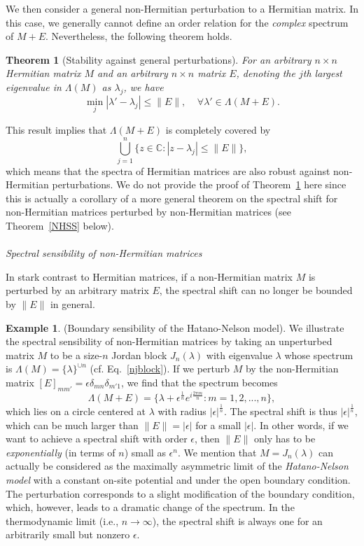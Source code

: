 \documentclass{tADP2e}
\theoremstyle{plain}
\theoremstyle{plain}
\newtheorem{theorem}{Theorem}[section]
\theoremstyle{definition}
\newtheorem{example}{Example}[section]
\newcommand{\exmp}[1]{
\begin{example}
	#1
\end{example}
}
\begin{document}
We then consider a general non-Hermitian perturbation to a Hermitian matrix. In this case, we generally cannot define an order relation for the \emph{complex} spectrum of $M+E$. Nevertheless, the following theorem holds. 
\begin{theorem}[Stability against general perturbations]
\label{HNH}
For an arbitrary $n\times n$ Hermitian matrix $M$ and an arbitrary $n\times n$ matrix $E$, denoting the $j$th largest eigenvalue in $\Lambda(M)$ as $\lambda_j$, we have
\begin{equation}
\min_j|\lambda'-\lambda_j|\le \|E\|,\;\;\;\;\forall \lambda'\in\Lambda(M+E).
\label{NHpert}
\end{equation}
\end{theorem}
\noindent This result implies that $\Lambda(M+E)$ is completely covered by
\begin{equation}
\bigcup^n_{j=1}\{z\in\mathbb{C}:|z-\lambda_j|\le\|E\|\},
\end{equation}
which means that the spectra of Hermitian matrices are also robust against non-Hermitian perturbations. We do not provide the proof of Theorem~\ref{HNH} here since this is actually a corollary of a more general theorem on the spectral shift for non-Hermitian matrices perturbed by non-Hermitian matrices (see Theorem~\ref{NHSS} below).
\\
\\
{\it Spectral sensibility of non-Hermitian matrices}

\vspace{3pt}
\noindent
In stark contrast to Hermitian matrices, if a non-Hermitian matrix $M$ is perturbed by an arbitrary matrix $E$, the spectral shift can no longer be bounded by $\|E\|$ in general. 

\exmp{\label{specsens}(Boundary sensibility of the Hatano-Nelson model). 
We illustrate the spectral sensibility of non-Hermitian matrices by taking an unperturbed matrix $M$ to be a size-$n$ Jordan block $J_n(\lambda)$ with eigenvalue $\lambda$ whose spectrum is $\Lambda(M)=\{\lambda\}^{\cup n}$ (cf. Eq.~\eqref{njblock}). If we perturb $M$ by the non-Hermitian matrix $[E]_{mm'}=\epsilon\delta_{mn}\delta_{m'1}$, we find that the spectrum becomes
\begin{equation}
\Lambda(M+E)=\{\lambda+\epsilon^\frac{1}{n}e^{i\frac{2\pi m}{n}}:m=1,2,...,n\},
\label{MEep}
\end{equation}
which lies on a circle centered at $\lambda$ with radius $|\epsilon|^{\frac{1}{n}}$. The spectral shift is thus $|\epsilon|^{\frac{1}{n}}$, which can be much larger than $\|E\|=|\epsilon|$ for a small $|\epsilon|$. In other words, if we want to achieve a spectral shift with order $\epsilon$, then $\|E\|$ only has to be \emph{exponentially} (in terms of $n$) small as $\epsilon^n$. We mention that $M=J_n(\lambda)$ can actually be considered as the maximally asymmetric limit of the \emph{Hatano-Nelson model} \cite{HN96} with a constant on-site potential and under the open boundary condition. The perturbation corresponds to a slight modification of the boundary condition, which, however, leads to a dramatic change of the spectrum. In the thermodynamic limit (i.e., $n\to\infty$), the spectral shift is always one for an arbitrarily small but nonzero $\epsilon$.
}
\end{document}
